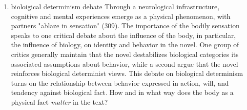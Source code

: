 \documentclass[11pt]{article}
\begin{document}
\begin{enumerate}
\item bioloigical determinism debate
\label{sec:orga7cdd3c}
Through a neurological infrastructure, cognitive and mental
experiences emerge as a physical phenomenon, with partners "ablaze in
sensation" (309). The importance of the bodily sensation speaks to one
critical debate about the influence of the body, in particular, the
influence of biology, on identity and behavior in the novel. One group
of critics generally maintain that the novel destabilizes biological
categories its associated assumptions about behavior, while a second
argue that the novel reinforces biological determinist views. This
debate on biological determinism turns on the relationship between
behavior expressed in action, will, and tendency against biological
fact. How and in what way does the body as a physical fact \emph{matter} in
the text?


\end{enumerate}
\end{document}
